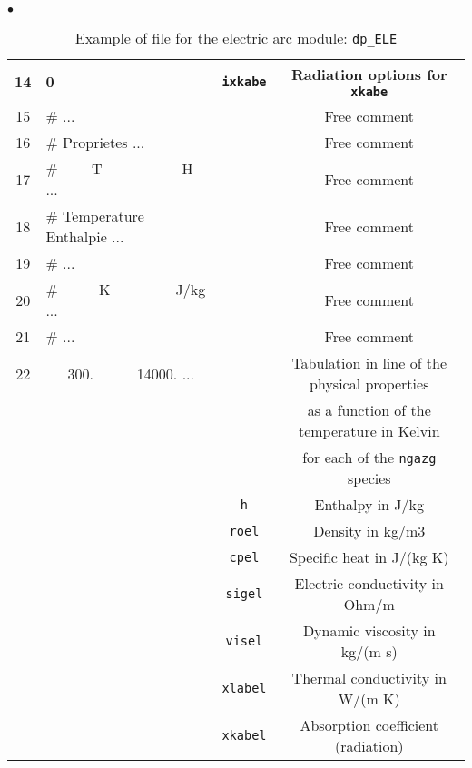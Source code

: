 {{{\begin{list}{$\bullet$}{}
\begin{table}[htbp]
\begin{center}
{\begin{tabular}{|c|l|c|c|}
 14     &        0           & \texttt{ixkabe\index{ixkabe}} & Radiation options for \texttt{xkabe\index{xkabe}}   \\ \hline
 15     &\#                            ... &           & Free comment                                       \\ \hline
 16     &\#  Proprietes                ... &           & Free comment                                       \\ \hline
 17     &\#  ~~~~T~~~~~~~~~~~H         ... &           & Free comment                                       \\ \hline
 18     &\#  Temperature  Enthalpie    ... &           & Free comment                                       \\ \hline
 19     &\#                            ... &           & Free comment                                       \\ \hline
 20     &\#  ~~~~~K~~~~~~~~~J/kg       ... &           & Free comment                                       \\ \hline
 21     &\#                            ... &           & Free comment                                       \\ \hline
 22     &    ~~~300.~~~~~~14000.       ... &           & Tabulation in line of the physical properties      \\
        &                                  &           & as a function of the temperature in Kelvin         \\
        &                                  &           & for each of the \texttt{ngazg} species             \\
        &                    &    \texttt{h}                    & Enthalpy in J/kg                                   \\
        &                    &    \texttt{roel}                 & Density in kg/m3                                   \\
        &                    &    \texttt{cpel}                 & Specific heat in J/(kg K)                          \\
        &                    &    \texttt{sigel}                & Electric conductivity in Ohm/m                     \\
        &                    &    \texttt{visel}                & Dynamic viscosity in kg/(m s)                      \\
        &                    &    \texttt{xlabel}               & Thermal conductivity in W/(m K)                    \\
        &                    &    \texttt{xkabel\index{xkabel}} & Absorption coefficient (radiation)                 \\   \hline
\end{tabular}
}
\caption{Example of file for the electric arc module:
 \texttt{dp\_ELE}}\label{tab_dpELE}
\end{center}
\end{table}


\end{list}}}}
